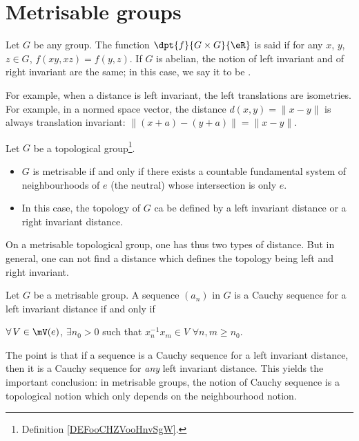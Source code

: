 \section{Metrisable groups}\label{sec:metrisable_groups}

Let $G$ be any group. The function $\dpt{f}{G\times G}{\eR}$ is said  if for any $x$, $y$, $z\in G$, $f(xy,xz)=f(y,z)$. If $G$ is abelian, the notion of left invariant and of right invariant are the same; in this case, we say it to be .

For example, when a distance is left invariant, the left translations are isometries. For example, in a normed space vector, the distance $d(x,y)=\|x-y\|$ is always translation invariant: $\| (x+a)-(y+a) \|=\|x-y\|$.



\begin{proposition}
	Let $G$ be a topological group\footnote{Definition \ref{DEFooCHZVooHnvSgW}.}.
	\begin{itemize}
		\item $G$ is metrisable if and only if there exists a countable fundamental system of neighbourhoods of $e$ (the neutral) whose intersection is only $e$.
		\item In this case, the topology of $G$ ca be defined by a left invariant distance or a right invariant distance.
	\end{itemize}
\end{proposition}




On a metrisable topological group, one has thus two types of distance. But in general, one can not find a distance which defines the topology being left and right invariant.

\begin{proposition}
	Let $G$ be a metrisable group. A sequence $(a_n)$ in $G$ is a Cauchy sequence for a left invariant distance if and only if

	$\forall\, V\in\mV(e)$, $\exists n_0>0$ such that $x_n^{-1} x_m\in V$ $\forall n,m\geq n_0$.
	\label{prop:Cauchy_metrisable}
\end{proposition}

The point is that if a sequence is a Cauchy sequence for a left invariant distance, then it is a Cauchy sequence for \emph{any} left invariant distance. This yields the important conclusion: in metrisable groups, the notion of Cauchy sequence is a topological notion which only depends on the neighbourhood notion.

